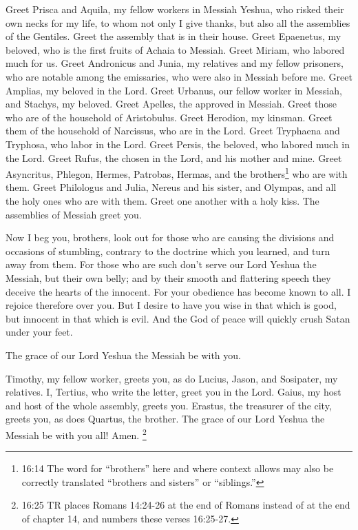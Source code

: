 \myverse{}Greet Prisca and Aquila, my fellow workers in Messiah Yeshua,
\myverse{}who risked their own necks for my life, to whom not only I give thanks, but
also all the assemblies of the Gentiles.
\myverse{}Greet the assembly that is in their house. Greet Epaenetus, my beloved, who
is the first fruits of Achaia to Messiah.
\myverse{}Greet Miriam, who labored much for us.
\myverse{}Greet Andronicus and Junia, my relatives and my fellow prisoners, who are notable
among the emissaries, who were also in Messiah before me.
\myverse{}Greet Amplias, my beloved in the Lord.
\myverse{}Greet Urbanus, our fellow worker in Messiah, and Stachys, my beloved.
\myverse{}Greet Apelles, the approved in Messiah. Greet those who are of the household
of Aristobulus.
\myverse{}Greet Herodion, my kinsman. Greet them of the household of Narcissus, who are in the Lord. \myverse{}Greet Tryphaena and Tryphosa, who labor in the Lord. Greet Persis, the beloved, who labored much in the Lord. \myverse{}Greet Rufus, the chosen in the Lord, and his mother and mine. \myverse{}Greet Asyncritus, Phlegon, Hermes, Patrobas, Hermas, and the brothers\footnote{16:14 The word for “brothers” here and where context allows may also be correctly translated “brothers and sisters” or “siblings.”} who are with them.
\myverse{}Greet Philologus and Julia, Nereus and his sister, and Olympas, and all the
holy ones who are with them.
\myverse{}Greet one another with a holy kiss. The assemblies of Messiah greet you.

\myverse{}Now I beg you, brothers, look out for those who are causing
the divisions and occasions of stumbling, contrary to the doctrine which you learned, and turn away from
them.
\myverse{}For those who are such don’t serve our Lord Yeshua the Messiah, but their
own belly; and by their smooth and flattering speech they deceive the hearts of the innocent.
\myverse{}For your obedience has become known to all. I rejoice therefore over you.
But I desire to have you wise in that which is good, but innocent in that which is evil.
\myverse{}And the God of peace will quickly crush Satan under your feet.

The grace of our Lord Yeshua the Messiah be with you.

\myverse{}Timothy, my fellow worker, greets you, as do Lucius, Jason,
and Sosipater, my relatives.
\myverse{}I, Tertius, who write the letter, greet you in the Lord.
\myverse{}Gaius, my host and host of the whole assembly, greets you. Erastus, the treasurer of the city, greets you, as does Quartus, the brother.
\myverse{}The grace of our Lord Yeshua the Messiah be with you all! Amen.
\myverse{}\footnote{16:25 TR places Romans 14:24-26 at the end of Romans instead of at the end of chapter 14, and numbers these verses 16:25-27.}


